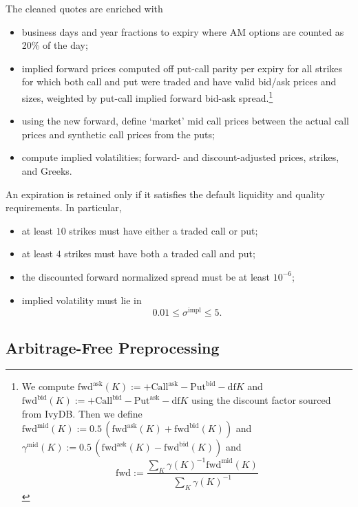 \documentclass[11pt,a4paper]{article}
\begin{document}
The cleaned quotes are enriched with
%
\begin{itemize}
    \item business days and year fractions to expiry where AM options are counted as 20\% of
    the day;
    \item implied forward prices computed off put-call parity per expiry for all strikes
          for which both call and put were traded and have valid bid/ask prices and sizes, weighted by put-call implied forward bid-ask spread.\footnote{
            We compute
            $\mathrm{fwd}^\mathrm{ask}(K):=+\mathrm{Call}^\mathrm{ask}-\mathrm{Put}^\mathrm{bid}-\mathrm{df} K$ and
            $\mathrm{fwd}^\mathrm{bid}(K):=+\mathrm{Call}^\mathrm{bid}-\mathrm{Put}^\mathrm{ask}-\mathrm{df} K$ using the discount factor sourced from IvyDB. 
            Then we
            define $\mathrm{fwd}^\mathrm{mid}(K) := 0.5\,(\mathrm{fwd}^\mathrm{ask}(K) + \mathrm{fwd}^\mathrm{bid}(K))$ and $\gamma^\mathrm{mid}(K) := 0.5\,(\mathrm{fwd}^\mathrm{ask}(K) - \mathrm{fwd}^\mathrm{bid}(K))$ and
            $$
                \mathrm{fwd} :=\frac{ \sum_K \gamma(K)^{-1} \mathrm{fwd}^\mathrm{mid}(K) }
                 { \sum_K \gamma(K)^{-1} }
            $$
          }
    \item using the new forward, define `market' mid call prices between the actual call
    prices and synthetic call prices from the puts;
    \item compute implied volatilities; forward- and discount-adjusted prices, strikes, and Greeks.
\end{itemize}
An expiration is retained only if it satisfies the default liquidity and quality requirements. In particular,
%
\begin{itemize}
    \item at least \(10\) strikes must have either a traded call or put;
    \item at least \(4\) strikes must have both a traded call and put;
    \item the discounted forward normalized spread must be at least \(10^{-6}\);
    \item implied volatility must lie in
    \[
        0.01 \leq \sigma^{\mathrm{impl}} \leq 5.
    \]
\end{itemize}

\subsection{Arbitrage-Free Preprocessing}
\end{document}
